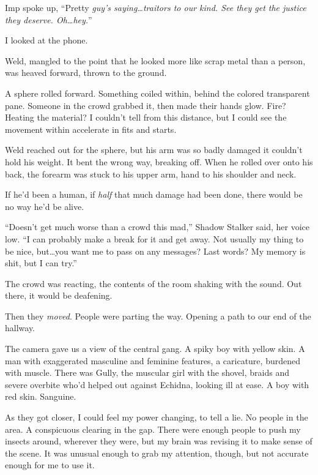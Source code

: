 Imp spoke up, ``Pretty \emph{guy's saying\ldots traitors to our kind.  See they get the justice they deserve.  Oh\ldots hey.}''



I looked at the phone.



Weld, mangled to the point that he looked more like scrap metal than a person, was heaved forward, thrown to the ground.



A sphere rolled forward.  Something coiled within, behind the colored transparent pane.  Someone in the crowd grabbed it, then made their hands glow.  Fire?  Heating the material?  I couldn't tell from this distance, but I could see the movement within accelerate in fits and starts.



Weld reached out for the sphere, but his arm was so badly damaged it couldn't hold his weight.  It bent the wrong way, breaking off.  When he rolled over onto his back, the forearm was stuck to his upper arm, hand to his shoulder and neck.



If he'd been a human, if \emph{half} that much damage had been done, there would be no way he'd be alive.



``Doesn't get much worse than a crowd this mad,'' Shadow Stalker said, her voice low.  ``I can probably make a break for it and get away.  Not usually my thing to be nice, but\ldots you want me to pass on any messages?  Last words?  My memory is shit, but I can try.''



The crowd was reacting, the contents of the room shaking with the sound.  Out there, it would be deafening.



Then they\emph{ moved}.  People were parting the way.  Opening a path to our end of the hallway.



The camera gave us a view of the central gang.  A spiky boy with yellow skin.  A man with exaggerated masculine and feminine features, a caricature, burdened with muscle.  There was Gully, the muscular girl with the shovel, braids and severe overbite who'd helped out against Echidna, looking ill at ease.  A boy with red skin.  Sanguine.



As they got closer, I could feel my power changing, to tell a lie.  No people in the area.  A conspicuous clearing in the gap.  There were enough people to push my insects around, wherever they were, but my brain was revising it to make sense of the scene.  It was unusual enough to grab my attention, though, but not accurate enough for me to use it.




